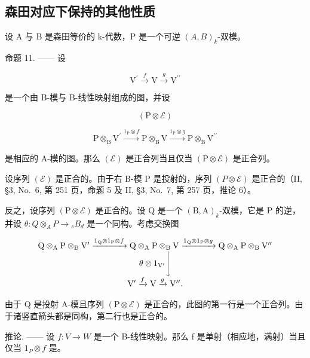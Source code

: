\subsection{森田对应下保持的其他性质}

设 A 与 B 是森田等价的 k-代数，P 是一个可逆 \((A,B)_{k}\)-双模。

命题 11. —— 设

\[
\mathrm{V} ^ {\prime} \xrightarrow {f} \mathrm{V} \xrightarrow {g} \mathrm{V} ^ {\prime \prime}\tag{ε}
\]

是一个由 B-模与 B-线性映射组成的图，并设

\[
(\mathrm{P} \otimes \mathcal {E})
\]

\[
\mathrm{P} \otimes_ {\mathrm{B}} \mathrm{V} ^ {\prime} \xrightarrow {1 _ {\mathrm{P}} \otimes f} \mathrm{P} \otimes_ {\mathrm{B}} \mathrm{V} \xrightarrow {1 _ {\mathrm{P}} \otimes g} \mathrm{P} \otimes_ {\mathrm{B}} \mathrm{V} ^ {\prime \prime}
\]

是相应的 A-模的图。那么 \((\mathcal{E})\) 是正合列当且仅当 \((\mathrm{P} \otimes \mathcal{E})\) 是正合列。

设序列 \((\mathcal{E})\) 是正合的。由于右 B-模 P 是投射的，序列 \((P \otimes \mathcal{E})\) 是正合的（II, §3, No.~6, 第 251 页，命题 5 及 II, §3, No.~7, 第 257 页，推论 6）。

反之，设序列 \((\mathrm{P} \otimes \mathcal{E})\) 是正合的。设 Q 是一个 \((\mathrm{B}, \mathrm{A})_{k}\)-双模，它是 P 的逆，并设 \(\theta : Q \otimes_{A} P \to {}_{s} B_{d}\) 是一个同构。考虑交换图

\[
\begin{array}{c} \mathrm{Q} \otimes_ {\mathrm{A}} \mathrm{P} \otimes_ {\mathrm{B}} \mathrm{V} ^ {\prime} \xrightarrow {1 _ {\mathrm{Q}} \otimes 1 _ {\mathrm{P}} \otimes f} \mathrm{Q} \otimes_ {\mathrm{A}} \mathrm{P} \otimes_ {\mathrm{B}} \mathrm{V} \xrightarrow {1 _ {\mathrm{Q}} \otimes 1 _ {\mathrm{P}} \otimes g} \mathrm{Q} \otimes_ {\mathrm{A}} \mathrm{P} \otimes_ {\mathrm{B}} \mathrm{V} ^ {\prime \prime} \\ \theta \otimes 1 _ {\mathrm{V} ^ {\prime}} \Biggl \downarrow \\ \mathrm{V} ^ {\prime} \xrightarrow {f} \mathrm{V} \xrightarrow {g} \mathrm{V} ^ {\prime \prime}. \end{array}
\]

由于 Q 是投射 A-模且序列 \((\mathrm{P} \otimes \mathcal{E})\) 是正合的，此图的第一行是一个正合列。由于诸竖直箭头都是同构，第二行也是正合的。

推论. —— 设 \(f: V \rightarrow W\) 是一个 B-线性映射。那么 f 是单射（相应地，满射）当且仅当 \(1_{P} \otimes f\) 是。

